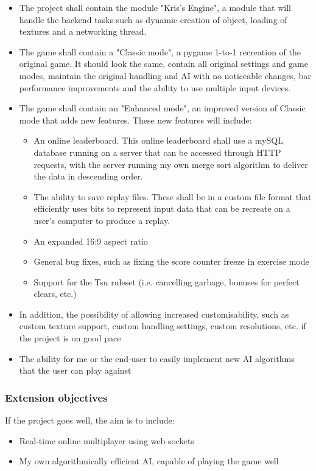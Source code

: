 \documentclass{article}
\begin{document}
\begin{itemize}
    \renewcommand\labelitemi{--}
    \item The project shall contain the module "Kris's Engine", a module that will handle the backend tasks such as dynamic creation of object, loading of textures and a networking thread.
    \item The game shall contain a "Classic mode", a pygame 1-to-1 recreation of the original game. It should look the same, contain all original settings and game modes, maintain the original handling and AI with no noticeable changes, bar performance improvements and the ability to use multiple input devices.
    \item The game shall contain an "Enhanced mode", an improved version of Classic mode that adds new features. These new features will include:
    \begin{itemize}
        \renewcommand\labelitemi{--}
        \item An online leaderboard. This online leaderboard shall use a mySQL database running on a server that can be accessed through HTTP requests, with the server running my own merge sort algorithm to deliver the data in descending order.
        \item The ability to save replay files. These shall be in a custom file format that efficiently uses bits to represent input data that can be recreate on a user's computer to produce a replay.
        \item An expanded 16:9 aspect ratio
        \item General bug fixes, such as fixing the score counter freeze in exercise mode
        \item Support for the Tsu ruleset (i.e. cancelling garbage, bonuses for perfect clears, etc.)
    \end{itemize}
    \item In addition, the possibility of allowing increased customisability, such as custom texture support, custom handling settings, custom resolutions, etc. if the project is on good pace
    \item The ability for me or the end-user to easily implement new AI algorithms that the user can play against
\end{itemize}

\subsubsection{Extension objectives}

If the project goes well, the aim is to include:
\begin{itemize}
    \renewcommand\labelitemi{--}
    \item Real-time online multiplayer using web sockets
    \item My own algorithmically efficient AI, capable of playing the game well
\end{itemize}
\end{document}
